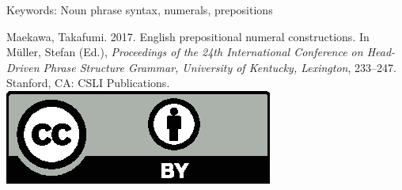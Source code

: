 \documentclass[11pt,a4paper,fleqn]{article}
\begin{document}
\noindent
Keywords: Noun 
phrase syntax, numerals, prepositions


\vfill
\noindent
Maekawa, Takafumi. 2017. English prepositional numeral 
constructions. In Müller, Stefan (Ed.), \emph{{Proceedings of the 24th International Conference on Head-Driven Phrase Structure Grammar, University of Kentucky, Lexington}}, 233--247. Stanford,
CA: CSLI Publications. \hfill\href{http://creativecommons.org/licenses/by/4.0/}{\includegraphics[height=.75em]{Includes/ccby.eps}}

\newpage

\end{document}
